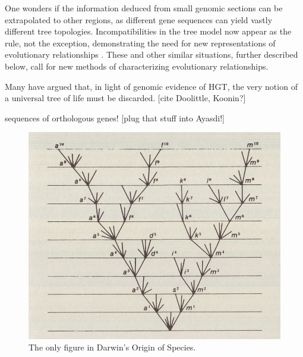 One wonders if the information deduced from small genomic sections can be extrapolated to other regions, as different gene sequences can yield vastly different tree topologies.
Incompatibilities in the tree model now appear as the rule, not the exception, demonstrating the need for new representations of evolutionary relationships \autocite{Doolittle:1999,Doolittle:2006}.
These and other similar situations, further described below, call for new methods of characterizing evolutionary relationships.

Many have argued that, in light of genomic evidence of HGT, the very notion of a universal tree of life must be discarded. [cite Doolittle, Koonin?]

sequences of orthologous genes! [plug that stuff into Ayasdi!]

\begin{figure}
\includegraphics[width=\columnwidth]{./fig/introduction/darwin_origin.png}
\caption[Charles Darwin's Tree]{The only figure in Darwin's Origin of Species.}
\label{fig:darwin_origin}
\end{figure}

